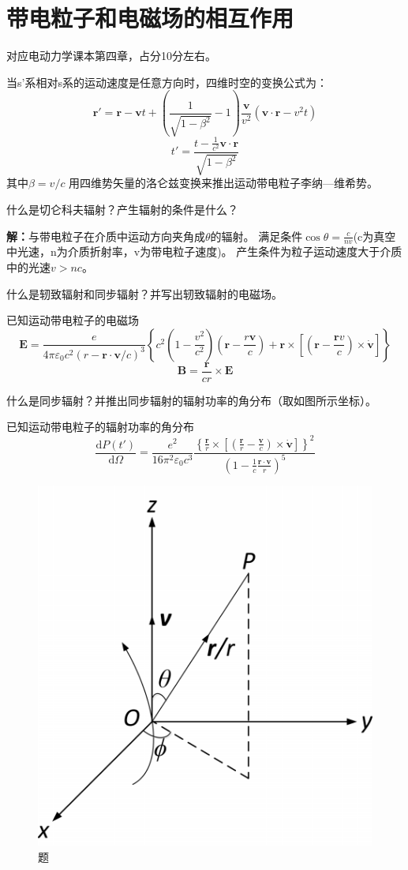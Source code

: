 \section{带电粒子和电磁场的相互作用}
对应电动力学课本第四章，占分10分左右。

\begin{question}
    当s'系相对s系的运动速度是任意方向时，四维时空的变换公式为：
    $$\mathbf{r}'=\mathbf{r}-\mathbf{v}t+(\frac{1}{\sqrt{1-\beta^2}}-1)\frac{\mathbf{v}}{v^2}(\mathbf{v}\cdot \mathbf{r}-v^2t)$$
    $$t'=\frac{t-\frac{1}{c^2}\mathbf{v}\cdot\mathbf{r}}{\sqrt{1-\beta^2}}$$
    其中$\beta=v/c$ 
 用四维势矢量的洛仑兹变换来推出运动带电粒子李纳—维希势。
\end{question}

\begin{question}
    什么是切仑科夫辐射？产生辐射的条件是什么？
\end{question}

\noindent\textbf{解：}与带电粒子在介质中运动方向夹角成$\theta$的辐射。
满足条件$\cos\theta=\frac{c}{nv}$(c为真空中光速，n为介质折射率，v为带电粒子速度)。
产生条件为粒子运动速度大于介质中的光速$v>nc$。


\begin{question}
    什么是轫致辐射和同步辐射？并写出轫致辐射的电磁场。
    
    已知运动带电粒子的电磁场
    $$\mathbf{E}=\frac{e}{4\pi\varepsilon_0 c^2(r-\mathbf{r}\cdot \mathbf{v}/c)^3 }\left \{ c^2(1-\frac{v^2}{c^2})(\mathbf{r}-\frac{r\mathbf{v}}{c})+\mathbf{r} \times\left [ (\mathbf{r}-\frac{\mathbf{r}v}{c})\times \dot{\mathbf{v}} \right ] \right \}$$
    $$\mathbf{B}=\frac{\mathbf{r}}{cr}\times \mathbf{E}$$
\end{question}

\begin{question}   
    什么是同步辐射？并推出同步辐射的辐射功率的角分布（取如图所示坐标）。
    
    已知运动带电粒子的辐射功率的角分布
    $$\frac{\mathrm{d} P(t')}{\mathrm{d} \Omega}=\frac{e^2}{16\pi^2 \varepsilon_0 c^3}\frac{\left \{ \frac{\mathbf{r}}{r}\times\left [ (\frac{\mathbf{r}}{r}-\frac{\mathbf{v}}{c})\times \dot{\mathbf{v}} \right ]  \right \}^2}{(1-\frac{1}{c}\frac{\mathbf{r}\cdot \mathbf{v}}{r})^5}$$
    \begin{figure}[ht]
        \centering
        \includegraphics[height=3 cm]{images/q7_1.png}
        \caption{题\thequestion}
    \end{figure}
\end{question}

